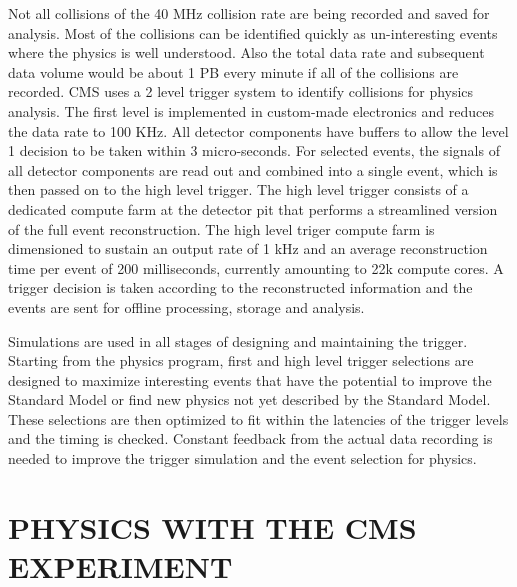 \documentclass{wscpaperproc}
\theoremstyle{wsc}
\begin{document}
Not all collisions of the 40 MHz collision rate are being recorded and saved for analysis. Most of the collisions can be identified quickly as un-interesting events where the physics is well understood. Also the total data rate and subsequent data volume would be about 1 PB every minute if all of the collisions are recorded. CMS uses a 2 level trigger system to identify collisions for physics analysis. The first level is implemented in custom-made electronics and reduces the data rate to 100 KHz. All detector components have buffers to allow the level 1 decision to be taken within 3 micro-seconds. For selected events, the signals of all detector components are read out and combined into a single event, which is then passed on to the high level trigger. The high level trigger consists of a dedicated compute farm at the detector pit that performs a streamlined version of the full event reconstruction. The high level triger compute farm is dimensioned to sustain an output rate of 1 kHz and an average reconstruction time per event of 200 milliseconds, currently amounting to 22k compute cores. A trigger decision is taken according to the reconstructed information and the events are sent for offline processing, storage and analysis.

Simulations are used in all stages of designing and maintaining the trigger. Starting from the physics program, first and high level trigger selections are designed to maximize interesting events that have the potential to improve the Standard Model or find new physics not yet described by the Standard Model. These selections are then optimized to fit within the latencies of the trigger levels and the timing is checked. Constant feedback from the actual data recording is needed to improve the trigger simulation and the event selection for physics.

\section{PHYSICS WITH THE CMS EXPERIMENT}
\label{sec:physics}
\end{document}
